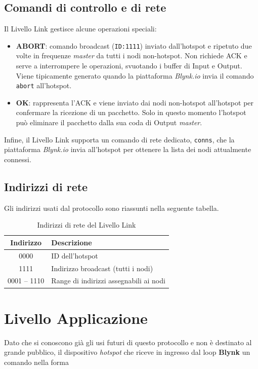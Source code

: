 \subsection{Comandi di controllo e di rete}

Il Livello Link gestisce alcune operazioni speciali:  
\begin{itemize}
  \item \textbf{ABORT}: comando broadcast (\texttt{ID:1111}) inviato dall’hotspot e ripetuto due volte in frequenze \emph{master} da tutti i nodi non-hotspot. Non richiede ACK e serve a interrompere le operazioni, svuotando i buffer di Input e Output. 
  Viene tipicamente generato quando la piattaforma \emph{Blynk.io} invia il comando \texttt{abort} all’hotspot.
  \item \textbf{OK}: rappresenta l’ACK e viene inviato dai nodi non-hotspot all’hotspot per confermare la ricezione di un pacchetto. 
  Solo in questo momento l’hotspot può eliminare il pacchetto dalla sua coda di Output \emph{master}.
\end{itemize}

Infine, il Livello Link supporta un comando di rete dedicato, \texttt{conns}, che la piattaforma \emph{Blynk.io} invia all’hotspot per ottenere la lista dei nodi attualmente connessi.  

\subsection{Indirizzi di rete}

Gli indirizzi usati dal protocollo sono riassunti nella seguente tabella.  

\begin{table}[H]
\centering
\begin{tabular}{|c|l|}
\hline
\textbf{Indirizzo} & \textbf{Descrizione} \\
\hline
0000 & ID dell'hotspot \\
1111 & Indirizzo broadcast (tutti i nodi) \\
0001 -- 1110 & Range di indirizzi assegnabili ai nodi \\
\hline
\end{tabular}
\caption{Indirizzi di rete del Livello Link}
\label{tab:indirizzi}
\end{table}

\section{Livello Applicazione}
\label{sec:livello_applicazione}
Dato che si conoscono già gli usi futuri di questo protocollo e non è destinato al grande pubblico, 
il dispositivo \textit{hotspot} che riceve in ingresso dal loop \textbf{Blynk} un comando nella forma


